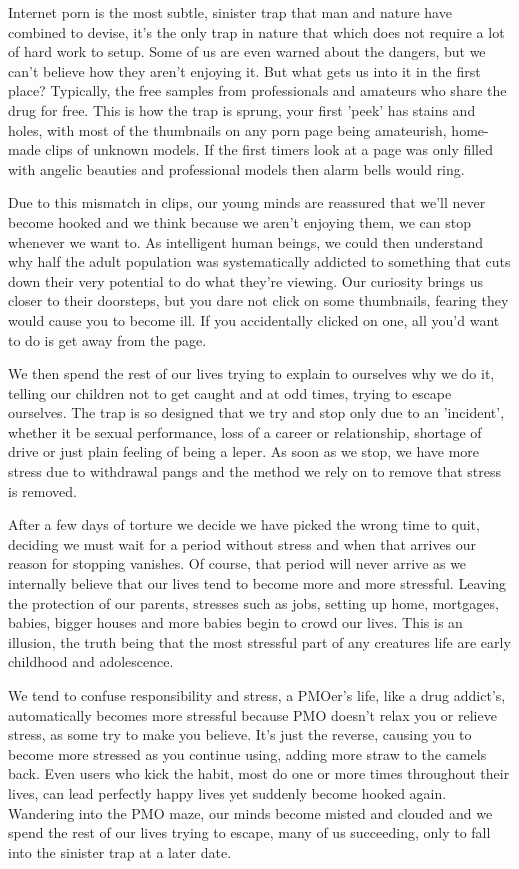\documentclass[easypeasy.tex]{subfiles}
\begin{document}
Internet porn is the most subtle, sinister trap that man and nature have combined to devise, it's the only trap in nature that which does not require a lot of hard work to setup. Some of us are even warned about the dangers, but we can't believe how they aren't enjoying it. But what gets us into it in the first place? Typically, the free samples from professionals and amateurs who share the drug for free. This is how the trap is sprung, your first 'peek' has stains and holes, with most of the thumbnails on any porn page being amateurish, home-made clips of unknown models. If the first timers look at a page was only filled with angelic beauties and professional models then alarm bells would ring.

Due to this mismatch in clips, our young minds are reassured that we'll never become hooked and we think because we aren't enjoying them, we can stop whenever we want to. As intelligent human beings, we could then understand why half the adult population was systematically addicted to something that cuts down their very potential to do what they're viewing. Our curiosity brings us closer to their doorsteps, but you dare not click on some thumbnails, fearing they would cause you to become ill. If you accidentally clicked on one, all you'd want to do is get away from the page.

We then spend the rest of our lives trying to explain to ourselves why we do it, telling our children not to get caught and at odd times, trying to escape ourselves. The trap is so designed that we try and stop only due to an 'incident', whether it be sexual performance, loss of a career or relationship, shortage of drive or just plain feeling of being a leper. As soon as we stop, we have more stress due to withdrawal pangs and the method we rely on to remove that stress is removed.

After a few days of torture we decide we have picked the wrong time to quit, deciding we must wait for a period without stress and when that arrives our reason for stopping vanishes. Of course, that period will never arrive as we internally believe that our lives tend to become more and more stressful. Leaving the protection of our parents, stresses such as jobs, setting up home, mortgages, babies, bigger houses and more babies begin to crowd our lives. This is an illusion, the truth being that the most stressful part of any creatures life are early childhood and adolescence.

We tend to confuse responsibility and stress, a PMOer's life, like a drug addict's, automatically becomes more stressful because PMO doesn't relax you or relieve stress, as some try to make you believe. It's just the reverse, causing you to become more stressed as you continue using, adding more straw to the camels back. Even users who kick the habit, most do one or more times throughout their lives, can lead perfectly happy lives yet suddenly become hooked again. Wandering into the PMO maze, our minds become misted and clouded and we spend the rest of our lives trying to escape, many of us succeeding, only to fall into the sinister trap at a later date.
\end{document}
